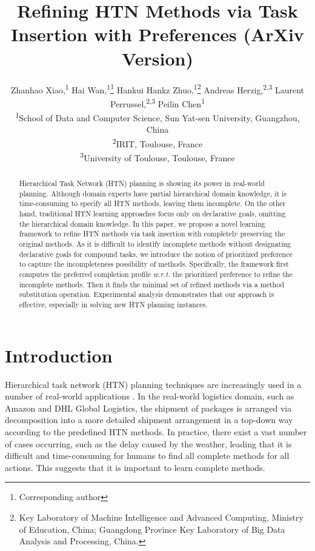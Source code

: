\documentclass[letterpaper]{article} %
\title{Refining HTN Methods via Task Insertion with Preferences (ArXiv Version)}
\author{Zhanhao Xiao,\textsuperscript{\rm 1} Hai Wan,\textsuperscript{\rm 1}\thanks{Corresponding author} Hankui Hankz Zhuo,\textsuperscript{\rm 1}\thanks{Key Laboratory of Machine Intelligence and Advanced Computing, Ministry of Education, China; Guangdong Province Key Laboratory of Big Data Analysis and Processing, China.} Andreas Herzig,\textsuperscript{\rm 2,3} Laurent Perrussel,\textsuperscript{\rm 2,3} Peilin Chen\textsuperscript{\rm 1}\\
\textsuperscript{\rm 1}School of Data and Computer Science, Sun Yat-sen University, Guangzhou, China\\
\textsuperscript{\rm 2}IRIT, Toulouse, France\\
\textsuperscript{\rm 3}University of Toulouse, Toulouse, France\\
}
\begin{document}
\maketitle
{}
\begin{abstract}
Hierarchical Task Network (HTN) planning is showing its power in real-world planning. Although domain experts have partial hierarchical domain knowledge, it is time-consuming to specify all HTN methods, leaving them incomplete. On the other hand, traditional HTN learning approaches focus only on declarative goals, omitting the hierarchical domain knowledge.
In this paper, we propose a novel learning framework to refine HTN methods via task insertion with completely preserving the original methods.
As it is difficult to identify incomplete methods without designating declarative goals for compound tasks, we introduce the notion of prioritized preference to capture the incompleteness possibility of methods.
Specifically, the framework first computes the preferred completion profile \emph{w.r.t.} the prioritized preference to refine the incomplete methods.
Then it finds the minimal set of refined methods via a method substitution operation.
Experimental analysis demonstrates that our approach is effective, especially in solving new HTN planning instances.
\end{abstract}

\section{Introduction}
Hierarchical task network (HTN) planning techniques \cite{erol1994htn} are increasingly used in a number of real-world applications \cite{lin2008web,DBLP:journals/aicom/BehnkeSKBSDDMGB19}.
In the real-world logistics domain, such as Amazon and DHL Global Logistics, the shipment of packages is arranged via decomposition into a more detailed shipment arrangement in a top-down way according to the predefined HTN methods.
In practice, there exist a vast number of cases occurring, such as the delay caused by the weather, leading that it is difficult and time-consuming for humans to find all complete methods for all actions.
This suggests that it is important to learn complete methods. %
\end{document}
